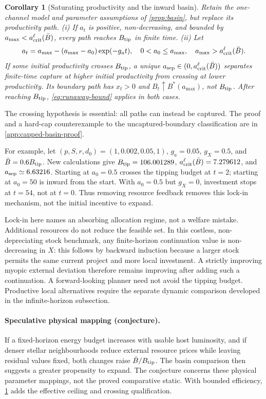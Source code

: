 \documentclass[11pt,a4paper]{article}
\newtheorem{corollary}[proposition]{Corollary}
\theoremstyle{definition}\newtheorem{definition}{Definition}
\begin{document}
\begin{corollary}[Saturating productivity and the inward basin]
\label{cor:capped-basin}
Retain the one-channel model and parameter assumptions of \cref{prop:basin},
but replace its productivity path.
(i) If $a_t$ is positive, non-decreasing, and bounded by
$a_{\max}<a_{\rm crit}^{\ell}(\bar B)$, every path reaches
$B_{\rm tip}$ in finite time.
(ii) Let
\begin{equation}
 a_t=a_{\max}-(a_{\max}-a_0)\exp(-g_at),\quad
 0<a_0\leq a_{\max},\quad a_{\max}>a_{\rm crit}^{\ell}(\bar B).
 \label{eq:saturating-productivity}
\end{equation}
If some initial productivity crosses $B_{\rm tip}$, a unique
$a_{\rm sep}\in(0,a_{\rm crit}^{\ell}(\bar B))$ separates finite-time
capture at higher initial productivity from crossing at lower productivity.
Its boundary path has $x_t>0$ and
$B_t\uparrow B^*(a_{\max})$, not $B_{\rm tip}$.
After reaching $B_{\rm tip}$, \cref{eq:runaway-bound} applies in both cases.
\end{corollary}
The crossing hypothesis is essential: all paths can instead be captured.
The proof and a hard-cap counterexample to the uncaptured-boundary
classification are in \cref{app:capped-basin-proof}.

For example, let $(p,S,r,d_0)=(1,0.002,0.05,1)$,
$g_a=0.05$, $g_X=0.5$, and $\bar B=0.6B_{\rm tip}$. New calculations
give $B_{\rm tip}=106.001289$,
$a_{\rm crit}^{\ell}(\bar B)=7.279612$, and
$a_{\rm sep}\simeq6.63216$. Starting at $a_0=0.5$ crosses the tipping
budget at $t=2$; starting at $a_0=50$ is inward from the start. With
$a_0=0.5$ but $g_X=0$, investment stops at $t=54$, not at $t=0$.
Thus removing resource feedback removes this lock-in mechanism, not
the initial incentive to expand.

Lock-in here names an absorbing allocation regime, not a welfare
mistake. Additional resources do not reduce the feasible set. In this
costless, non-depreciating stock benchmark, any finite-horizon
continuation value is non-decreasing in $X$: this follows by backward
induction because a larger stock permits the same current project and
more local investment. A strictly improving myopic external deviation
therefore remains improving after adding such a continuation. A
forward-looking planner need not avoid the tipping budget. Productive
local alternatives require the separate dynamic comparison developed
in the infinite-horizon subsection.

\paragraph{Speculative physical mapping (conjecture).}
If a fixed-horizon energy budget increases with usable host luminosity,
and if denser stellar neighbourhoods reduce external resource prices
while leaving residual values fixed, both changes raise
$\bar B/B_{\rm tip}$. The basin comparison then suggests a greater
propensity to expand. The conjecture concerns these physical parameter
mappings, not the proved comparative static. With bounded efficiency,
\cref{cor:capped-basin} adds the effective ceiling and crossing qualification.
\end{document}

